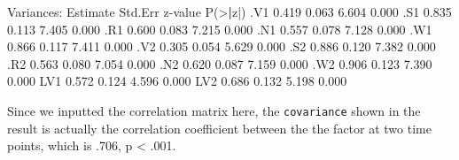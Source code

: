 \documentclass[
]{article}
\newenvironment{Shaded}{\begin{snugshade}}{\end{snugshade}}
\newcommand{\ErrorTok}[1]{\textcolor[rgb]{0.64,0.00,0.00}{\textbf{#1}}}
\newcommand{\FloatTok}[1]{\textcolor[rgb]{0.00,0.00,0.81}{#1}}
\newcommand{\FunctionTok}[1]{\textcolor[rgb]{0.00,0.00,0.00}{#1}}
\newcommand{\NormalTok}[1]{#1}
\newcommand{\SpecialCharTok}[1]{\textcolor[rgb]{0.00,0.00,0.00}{#1}}
\begin{document}
\begin{Shaded}
\begin{Highlighting}[]
\NormalTok{Variances}\SpecialCharTok{:}
\NormalTok{                   Estimate  Std.Err  z}\SpecialCharTok{{-}}\NormalTok{value  }\FunctionTok{P}\NormalTok{(}\SpecialCharTok{\textgreater{}}\ErrorTok{|}\NormalTok{z}\SpecialCharTok{|}\NormalTok{)}
\NormalTok{   .V1                }\FloatTok{0.419}    \FloatTok{0.063}    \FloatTok{6.604}    \FloatTok{0.000}
\NormalTok{   .S1                }\FloatTok{0.835}    \FloatTok{0.113}    \FloatTok{7.405}    \FloatTok{0.000}
\NormalTok{   .R1                }\FloatTok{0.600}    \FloatTok{0.083}    \FloatTok{7.215}    \FloatTok{0.000}
\NormalTok{   .N1                }\FloatTok{0.557}    \FloatTok{0.078}    \FloatTok{7.128}    \FloatTok{0.000}
\NormalTok{   .W1                }\FloatTok{0.866}    \FloatTok{0.117}    \FloatTok{7.411}    \FloatTok{0.000}
\NormalTok{   .V2                }\FloatTok{0.305}    \FloatTok{0.054}    \FloatTok{5.629}    \FloatTok{0.000}
\NormalTok{   .S2                }\FloatTok{0.886}    \FloatTok{0.120}    \FloatTok{7.382}    \FloatTok{0.000}
\NormalTok{   .R2                }\FloatTok{0.563}    \FloatTok{0.080}    \FloatTok{7.054}    \FloatTok{0.000}
\NormalTok{   .N2                }\FloatTok{0.620}    \FloatTok{0.087}    \FloatTok{7.159}    \FloatTok{0.000}
\NormalTok{   .W2                }\FloatTok{0.906}    \FloatTok{0.123}    \FloatTok{7.390}    \FloatTok{0.000}
\NormalTok{    LV1               }\FloatTok{0.572}    \FloatTok{0.124}    \FloatTok{4.596}    \FloatTok{0.000}
\NormalTok{    LV2               }\FloatTok{0.686}    \FloatTok{0.132}    \FloatTok{5.198}    \FloatTok{0.000}
\end{Highlighting}
\end{Shaded}

Since we inputted the correlation matrix here, the \texttt{covariance}
shown in the result is actually the correlation coefficient between the
the factor at two time points, which is .706, p \textless{} .001.
\end{document}
